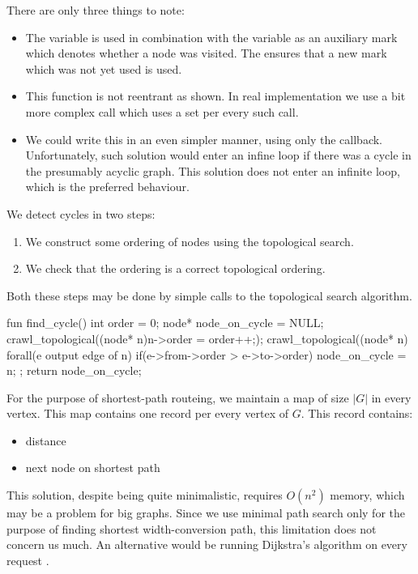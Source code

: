 There are only three things to note:
\begin{itemize}
  \item The  variable is used in combination with the  variable as an auxiliary mark which denotes whether a node was visited. The  ensures that a new mark which was not yet used is used.
  \item This function is not reentrant as shown. In real implementation we use a bit more complex call which uses a set per every such call.
  \item We could write this in an even simpler manner, using only the  callback. Unfortunately, such solution would enter an infine loop if there was a cycle in the presumably acyclic graph. This solution does not enter an infinite loop, which is the preferred behaviour. 
\end{itemize}

We detect cycles in two steps:
\begin{enumerate}
  \item We construct some ordering of nodes using the topological search.
  \item We check that the ordering is a correct topological ordering.
\end{enumerate}

Both these steps may be done by simple calls to the topological search algorithm.

\begin{code}
fun find_cycle()
{
  int order = 0;
  node* node_on_cycle = NULL;
  crawl_topological((node* n){n->order = order++;});
  crawl_topological((node* n){
    forall(e output edge of n) 
      if(e->from->order > e->to->order)
        node_on_cycle = n;
  };
  return node_on_cycle;
}
\end{code}

For the purpose of shortest-path routeing, we maintain a map of size $| G |$ in every vertex. This map contains one record per every vertex of $G$. This record contains:

\begin{itemize}
  \item distance
  \item next node on shortest path
\end{itemize}

This solution, despite being quite minimalistic, requires $O(n^2)$ memory, which may be a problem for big graphs. Since we use minimal path search only for the purpose of finding shortest width-conversion path, this limitation does not concern us much. An alternative would be running Dijkstra's algorithm on every request \cite{TODO}.

